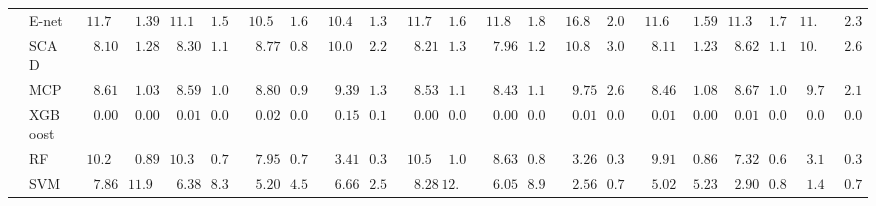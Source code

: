 \begin{tabular}{ll|ll|llllll|llllll|llllll}
 & E-net  & $\phantom{0}11.72$ & $\phantom{00}1.39$ & $\phantom{0}11.11$ & $\phantom{0}1.58$ & $\phantom{0}10.55$ & $\phantom{0}1.62$ & $\phantom{0}10.42$ & $\phantom{0}1.36$ & $\phantom{0}11.72$ & $\phantom{0}1.62$ & $\phantom{0}11.84$ & $\phantom{0}1.87$ & $\phantom{0}16.86$ & $\phantom{0}2.05$ & $\phantom{0}11.62$ & $\phantom{00}1.59$ & $\phantom{0}11.34$ & $\phantom{0}1.71$ & $11.05$ & $\phantom{0}2.39$ \\
 & SCAD  & $\phantom{00}8.10$ & $\phantom{00}1.28$ & $\phantom{00}8.30$ & $\phantom{0}1.15$ & $\phantom{00}8.77$ & $\phantom{0}0.89$ & $\phantom{0}10.07$ & $\phantom{0}2.21$ & $\phantom{00}8.21$ & $\phantom{0}1.34$ & $\phantom{00}7.96$ & $\phantom{0}1.28$ & $\phantom{0}10.83$ & $\phantom{0}3.09$ & $\phantom{00}8.11$ & $\phantom{00}1.23$ & $\phantom{00}8.62$ & $\phantom{0}1.13$ & $10.28$ & $\phantom{0}2.67$ \\
 & MCP  & $\phantom{00}8.61$ & $\phantom{00}1.03$ & $\phantom{00}8.59$ & $\phantom{0}1.04$ & $\phantom{00}8.80$ & $\phantom{0}0.98$ & $\phantom{00}9.39$ & $\phantom{0}1.38$ & $\phantom{00}8.53$ & $\phantom{0}1.11$ & $\phantom{00}8.43$ & $\phantom{0}1.12$ & $\phantom{00}9.75$ & $\phantom{0}2.61$ & $\phantom{00}8.46$ & $\phantom{00}1.08$ & $\phantom{00}8.67$ & $\phantom{0}1.08$ & $\phantom{0}9.72$ & $\phantom{0}2.14$ \\
 & XGBoost  & $\phantom{00}0.00$ & $\phantom{00}0.00$ & $\phantom{00}0.01$ & $\phantom{0}0.00$ & $\phantom{00}0.02$ & $\phantom{0}0.01$ & $\phantom{00}0.15$ & $\phantom{0}0.14$ & $\phantom{00}0.00$ & $\phantom{0}0.00$ & $\phantom{00}0.00$ & $\phantom{0}0.00$ & $\phantom{00}0.01$ & $\phantom{0}0.01$ & $\phantom{00}0.01$ & $\phantom{00}0.00$ & $\phantom{00}0.01$ & $\phantom{0}0.01$ & $\phantom{0}0.08$ & $\phantom{0}0.05$ \\
 & RF  & $\phantom{0}10.28$ & $\phantom{00}0.89$ & $\phantom{0}10.37$ & $\phantom{0}0.75$ & $\phantom{00}7.95$ & $\phantom{0}0.78$ & $\phantom{00}3.41$ & $\phantom{0}0.37$ & $\phantom{0}10.50$ & $\phantom{0}1.02$ & $\phantom{00}8.63$ & $\phantom{0}0.82$ & $\phantom{00}3.26$ & $\phantom{0}0.39$ & $\phantom{00}9.91$ & $\phantom{00}0.86$ & $\phantom{00}7.32$ & $\phantom{0}0.69$ & $\phantom{0}3.18$ & $\phantom{0}0.33$ \\
 & SVM  & $\phantom{00}7.86$ & $\phantom{0}11.99$ & $\phantom{00}6.38$ & $\phantom{0}8.36$ & $\phantom{00}5.20$ & $\phantom{0}4.55$ & $\phantom{00}6.66$ & $\phantom{0}2.53$ & $\phantom{00}8.28$ & $12.54$ & $\phantom{00}6.05$ & $\phantom{0}8.98$ & $\phantom{00}2.56$ & $\phantom{0}0.79$ & $\phantom{00}5.02$ & $\phantom{00}5.23$ & $\phantom{00}2.90$ & $\phantom{0}0.81$ & $\phantom{0}1.48$ & $\phantom{0}0.74$ \\\hline

\end{tabular}
